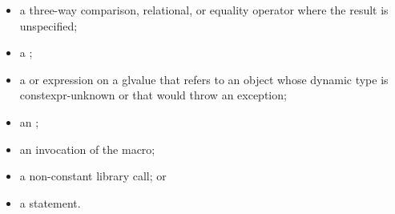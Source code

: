 \begin{itemize}
\item
a three-way comparison,
relational, or equality
operator where the result is unspecified;

\item
a ;

\item
a  or
 expression
on a glvalue that refers to an object
whose dynamic type is constexpr-unknown or
that would throw an exception;

\item
an ;

\item
an invocation of the  macro;

\item
a non-constant library call;
or

\item
a  statement.
\end{itemize}

